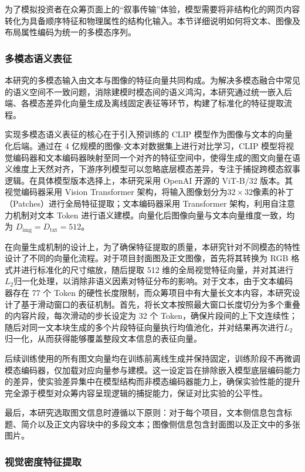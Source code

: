 为了模拟投资者在众筹页面上的``叙事传输''体验，模型需要将非结构化的网页内容转化为具备顺序特征和物理属性的结构化输入。本节详细说明如何将文本、图像及布局属性编码为统一的多模态序列。

\subsubsection{多模态语义表征}

本研究的多模态输入由文本与图像的特征向量共同构成。为解决多模态融合中常见的语义空间不一致问题，消除建模时模态间的语义鸿沟，本研究通过统一嵌入后端、各模态差异化向量生成及离线固定表征等环节，构建了标准化的特征提取流程。

实现多模态语义表征的核心在于引入预训练的 CLIP 模型作为图像与文本的向量化后端。通过在 4 亿规模的图像-文本对数据集上进行对比学习，CLIP 模型将视觉编码器和文本编码器映射至同一个对齐的特征空间中，使得生成的图文向量在语义维度上天然对齐，下游序列模型可以忽略底层模态差异，专注于捕捉跨模态叙事逻辑。在具体模型版本选择上，本研究采用 OpenAI 开源的 ViT-B/32 版本。其视觉编码器采用 Vision Transformer 架构，将输入图像划分为$ 32 \times 32 $像素的补丁（Patches）进行全局特征提取；文本编码器采用 Transformer 架构，利用自注意力机制对文本 Token 进行语义建模。向量化后图像向量与文本向量维度一致，均为 $ D_{\text{img}}=D_{\text{txt}}=512 $。

在向量生成机制的设计上，为了确保特征提取的质量，本研究针对不同模态的特性设计了不同的向量化流程。对于项目封面图及正文图像，首先将其转换为 RGB 格式并进行标准化的尺寸缩放，随后提取 512 维的全局视觉特征向量，并对其进行$ L_2 $归一化处理，以消除非语义因素对特征分布的影响。对于文本，由于文本编码器存在 77 个 Token 的硬性长度限制，而众筹项目中有大量长文本内容，本研究设计了基于滑动窗口的表征机制。首先，将长文本按照最大窗口长度切分为多个重叠的内容片段，每次滑动的步长设定为 32 个 Token，确保片段间的上下文连续性；随后对同一文本块生成的多个片段特征向量执行均值池化，并对结果再次进行$ L_2 $归一化，从而获得能够覆盖整段文本信息的表征向量。

后续训练使用的所有图文向量均在训练前离线生成并保持固定，训练阶段不再微调模态编码器，仅加载对应向量参与建模。这一设定旨在排除嵌入模型底层编码能力的差异，使实验差异集中在模型结构而非模态编码器能力上，确保实验性能的提升完全源于模型对众筹内容呈现逻辑的捕捉能力，保证对比实验的公平性。

最后，本研究选取图文信息时遵循以下原则：对于每个项目，文本侧信息包含标题、简介以及正文内容块中的多段文本；图像侧信息包含封面图以及正文中的多张图片。

\subsubsection{视觉密度特征提取}

